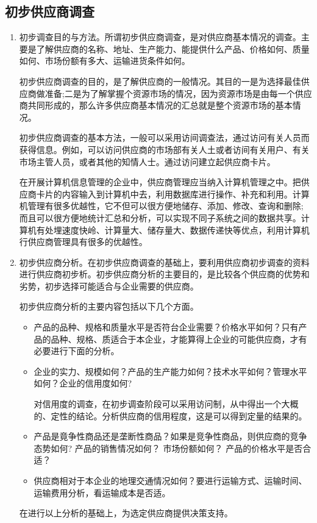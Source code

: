 \subsection {初步供应商调查}

    \begin{enumerate}
        \item 初步调查目的与方法。所谓初步供应商调查，是对供应商基本情况的调查。主要是了解供应商的名称、地址、生产能力、能提供什么产品、价格如何、质量如何、市场份额有多大、运输进货条件如何。

        初步供应商调查的目的，是了解供应商的一般情况。其目的一是为选择最佳供应商做准备;二是为了解掌握个资源市场的情况，因为资源市场是由每一个供应商共同形成的，那么许多供应商基本情况的汇总就是整个资源市场的基本情况。

        初步供应商调查的基本方法，一般可以采用访间调查法，通过访问有关人员而获得信息。例如，可以访问供应商的市场部有关人土或者访间有关用户、有关市场主管人员，或者其他的知情人士。通过访问建立起供应商卡片。

        在开展计算机信息管理的企业中，供应商管理应当纳入计算机管理之中。把供应商卡片的内容输入到计算机中去，利用数据库进行操作、补充和利用。计算机管理有很多优越性，它不但可以很方便地储存、添加、修改、查询和删除; 而且可以很方便地统计汇总和分析，可以实现不同子系统之间的数据共享。计算机有处埋速度快岭、计算量大、储存量大、数据传递快等优点，利用计算机行供应商管理具有很多的优越性。

        \item 初步供应商分析。在初步供应商调查的基础上，要利用供应商初步调查的资料进行供应商初步析。初步供应商分析的主要目的，是比较各个供应商的优势和劣势，初步选择可能适合与企业需要的供应商。

        初步供应商分析的主要内容包括以下几个方面。

        \begin{itemize}
            \item  产品的品种、规格和质量水平是否符台企业需要？价格水平如何？只有产品的品种、规格、质适合于本企业，才能算得上企业的可能供应商，才有必要进行下面的分析。

            \item  企业的实力、规模如何？产品的生产能力如何？技术水平如何？管理水平如何？企业的信用度如何?

            对信用度的调查，在初步调查阶段可以采用访问制，从中得出一个大概的、定性的结论。分析供应商的信用程度，这是可以得到定量的结果的。

            \item  产品是竟争性商品还是垄断性商品？如果是竞争性商品，则供应商的竞争态势如何? 产品的销售情况如何？ 市场份额如何？ 产品的价格水平是否合适？

            \item  供应商相对于本企业的地理交通情况如何？要进行运输方式、运输时间、运输费用分析，看运输成本是否适。
        \end{itemize}
        在进行以上分析的基础上，为选定供应商提供决策支持。
    \end{enumerate}

